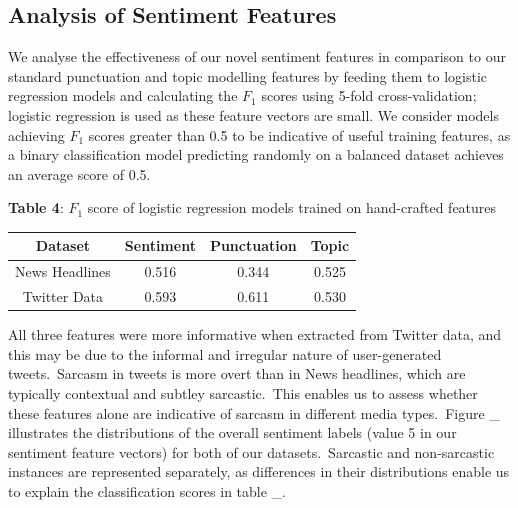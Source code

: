 \documentclass[12pt,a4paper]{article}
\begin{document}
\subsection{Analysis of Sentiment Features}\vspace{-5pt}
\noindent We analyse the effectiveness of our novel sentiment features in comparison to our standard punctuation and topic modelling features by feeding them to logistic regression models and calculating the $F_1$ scores using 5-fold cross-validation; logistic regression is used as these feature vectors are small. We consider models achieving $F_1$ scores greater than 0.5 to be indicative of useful training features, as a binary classification model predicting randomly on a balanced dataset achieves an average score of 0.5. \\\vspace{-20pt}


\begin{center}
	\textbf{Table 4}: $F_1$ score of logistic regression models trained on hand-crafted features
\end{center}\vspace{-20pt}

\begin{center}
	\begin{tabular}{|c||c|c|c|} 
	\hline
	\textbf{Dataset} & \textbf{Sentiment} & \textbf{Punctuation} & \textbf{Topic} \\ [0.4ex] 
	\hline\hline
	News Headlines& 0.516 & 0.344 & 0.525\\ 
	\hline
	Twitter Data & 0.593 & 0.611 & 0.530\\
	\hline
\end{tabular}
\end{center}\vspace{-5pt}

\noindent All three features were more informative when extracted from Twitter data, and this may be due to the informal and irregular nature of user-generated tweets.\ Sarcasm in tweets is more overt than in News headlines, which are typically contextual and subtley sarcastic.\ This enables us to assess whether these features alone are indicative of sarcasm in different media types.\ Figure \_ illustrates the distributions of the overall sentiment labels (value 5 in our sentiment feature vectors) for both of our datasets.\ Sarcastic and non-sarcastic instances are represented separately, as differences in their distributions enable us to explain the classification scores in table \_.
\end{document}
